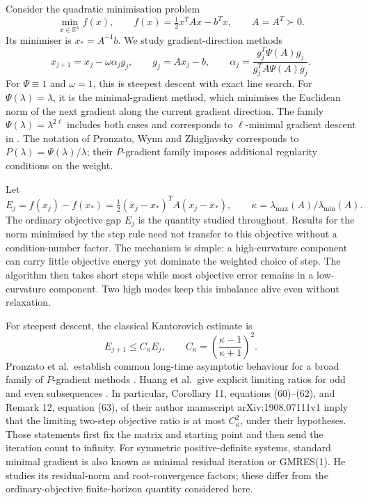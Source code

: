 \documentclass[11pt,a4paper]{article}
\theoremstyle{remark}
\newcommand{\R}{\mathbb R}
\newcommand{\Ck}{C_\kappa}
\begin{document}
Consider the quadratic minimisation problem
\begin{equation}\label{eq:objective}
 \min_{x\in\R^n} f(x),\qquad
 f(x)=\tfrac12x^TAx-b^Tx,\qquad A=A^T\succ0.
\end{equation}
Its minimiser is $x_*=A^{-1}b$. We study gradient-direction methods
\begin{equation}\label{eq:iteration}
 x_{j+1}=x_j-\omega\alpha_jg_j,\qquad
 g_j=Ax_j-b,\qquad
 \alpha_j=\frac{g_j^T\Psi(A)g_j}{g_j^TA\Psi(A)g_j}.
\end{equation}
For $\Psi\equiv1$ and $\omega=1$, this is steepest descent with exact line search. For $\Psi(\lambda)=\lambda$, it is the minimal-gradient method, which minimises the Euclidean norm of the next gradient along the current gradient direction. The family $\Psi(\lambda)=\lambda^{2\ell}$ includes both cases and corresponds to $\ell$-minimal gradient descent in \cite{MMT2025}. The notation of Pronzato, Wynn and Zhigljavsky \cite{PWZ2006} corresponds to $P(\lambda)=\Psi(\lambda)/\lambda$; their $P$-gradient family imposes additional regularity conditions on the weight.

Let
\[
 E_j=f(x_j)-f(x_*)=\tfrac12(x_j-x_*)^TA(x_j-x_*),
 \qquad \kappa=\lambda_{\max}(A)/\lambda_{\min}(A).
\]
The ordinary objective gap $E_j$ is the quantity studied throughout. Results for the norm minimised by the step rule need not transfer to this objective without a condition-number factor. The mechanism is simple: a high-curvature component can carry little objective energy yet dominate the weighted choice of step. The algorithm then takes short steps while most objective error remains in a low-curvature component. Two high modes keep this imbalance alive even without relaxation.

For steepest descent, the classical Kantorovich estimate is
\begin{equation}\label{eq:kantorovich}
 E_{j+1}\le\Ck E_j,\qquad
 \Ck=\left(\frac{\kappa-1}{\kappa+1}\right)^2.
\end{equation}
Pronzato et al.\ establish common long-time asymptotic behaviour for a broad family of $P$-gradient methods \cite{PWZ2006}. Huang et al.\ give explicit limiting ratios for odd and even subsequences \cite{HDLZ2022}. In particular, Corollary 11, equations (60)--(62), and Remark 12, equation (63), of their author manuscript arXiv:1908.07111v1 imply that the limiting two-step objective ratio is at most $\Ck^2$, under their hypotheses. Those statements first fix the matrix and starting point and then send the iteration count to infinity. For symmetric positive-definite systems, standard minimal gradient is also known as minimal residual iteration or GMRES(1). He \cite{He2025} studies its residual-norm and root-convergence factors; these differ from the ordinary-objective finite-horizon quantity considered here.
\end{document}

